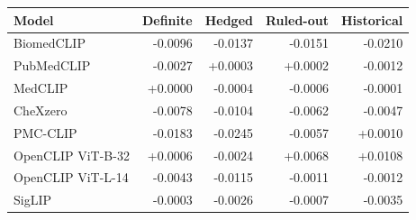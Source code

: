 \begin{tabular}{lrrrr}
\toprule
Model & Definite & Hedged & Ruled-out & Historical \\
\midrule
BiomedCLIP & -0.0096 & -0.0137 & -0.0151 & -0.0210 \\
PubMedCLIP & -0.0027 & +0.0003 & +0.0002 & -0.0012 \\
MedCLIP & +0.0000 & -0.0004 & -0.0006 & -0.0001 \\
CheXzero & -0.0078 & -0.0104 & -0.0062 & -0.0047 \\
PMC-CLIP & -0.0183 & -0.0245 & -0.0057 & +0.0010 \\
OpenCLIP ViT-B-32 & +0.0006 & -0.0024 & +0.0068 & +0.0108 \\
OpenCLIP ViT-L-14 & -0.0043 & -0.0115 & -0.0011 & -0.0012 \\
SigLIP & -0.0003 & -0.0026 & -0.0007 & -0.0035 \\
\bottomrule
\end{tabular}
